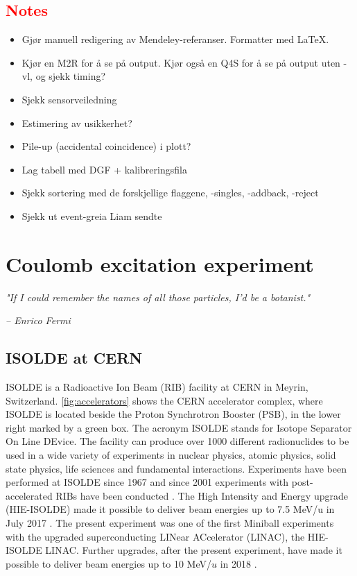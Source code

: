 \documentclass[twoside,english]{uiofysmaster/uiofysmaster}
\let\orgautoref\autoref
\renewcommand{\autoref}
        {%
		 \def\sectionautorefname{Section}%
		 \def\subsectionautorefname{Section}%
		 \def\subsubsectionautorefname{Section}%
		 \def\chapterautorefname{Chapter}%
          \orgautoref}
\begin{document}
\section*{\textcolor{red}{Notes}}
\begin{itemize}
	\item Gjør manuell redigering av Mendeley-referanser. Formatter med LaTeX.
	\item Kjør en M2R for å se på output. Kjør også en Q4S for å se på output uten -vl, og sjekk timing?
	\item Sjekk sensorveiledning
	\item Estimering av usikkerhet?
	\item Pile-up (accidental coincidence) i plott?
	\item Lag tabell med DGF + kalibreringsfila
	\item Sjekk sortering med de forskjellige flaggene, -singles, -addback, -reject
	\item Sjekk ut event-greia Liam sendte
\end{itemize}


\newpage


\chapter{Coulomb excitation experiment}
\epigraph{\textit{"If I could remember the names of all those particles, I'd be a botanist."}}{\textit{– Enrico Fermi}}

\section{ISOLDE at CERN}
ISOLDE is a Radioactive Ion Beam (RIB) facility at CERN in Meyrin, Switzerland. \autoref{fig:accelerators} shows the CERN accelerator complex, where ISOLDE is located beside the Proton Synchrotron Booster (PSB), in the lower right marked by a green box. The acronym ISOLDE stands for Isotope Separator On Line DEvice. The facility can produce over 1000 different radionuclides to be used in a wide variety of experiments in nuclear physics, atomic physics, solid state physics, life sciences and fundamental interactions. Experiments have been performed at ISOLDE since 1967 and since 2001 experiments with post-accelerated RIBs have been conducted  \cite{HIE-ISOLDE, ISOLDE-web, ISOLDE-facility}. 
The High Intensity and Energy upgrade (HIE-ISOLDE) made it possible to deliver beam energies up to 7.5 MeV/u in July 2017 \cite{CERN-news}. 
The present experiment was one of the first Miniball experiments with the upgraded superconducting LINear ACcelerator (LINAC), the HIE-ISOLDE LINAC. 
Further upgrades, after the present experiment, have made it possible to deliver beam energies up to 10 MeV/$u$ in 2018 \cite{HIE-ISOLDE}. 
\end{document}
